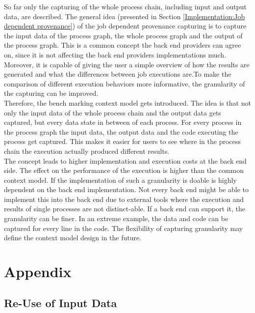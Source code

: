 \documentclass[draft,final]{vutinfth} %
\begin{document}
So far only the capturing of the whole process chain, including input and output data, are described. The general idea (presented in Section \ref{Implementation:Job dependent provenance}) of the job dependent provenance capturing is to capture the input data of the process graph, the whole process graph and the output of the process graph. This is a common concept the back end providers can agree on, since it is not affecting the back end providers implementations much. Moreover, it is capable of giving the user a simple overview of how the results are generated and what the differences between job executions are.To make the comparison of different execution behaviors more informative, the granularity of the capturing can be improved. \\
Therefore, the bench marking context model gets introduced. The idea is that not only the input data of the whole process chain and the output data gets captured, but every data state in between of each process. For every process in the process graph the input data, the output data and the code executing the process get captured. This makes it easier for users to see where in the process chain the execution actually produced different results.\\ The concept leads to higher implementation and execution costs at the back end side. The effect on the performance of the execution is higher than the common context model. If the implementation of such a granularity is  doable is highly dependent on the back end implementation. Not every back end might be able to implement this into the back end due to external tools where the execution and results of single processes are not distinct-able. If a back end can support it, the granularity can be finer. In an extreme example, the data and code can be captured for every line in the code. The flexibility of capturing granularity may define the context model design in the future.  

\chapter{Appendix}\label{Appendix}

\section{Re-Use of Input Data}\label{usecase1appendix}
\end{document}
